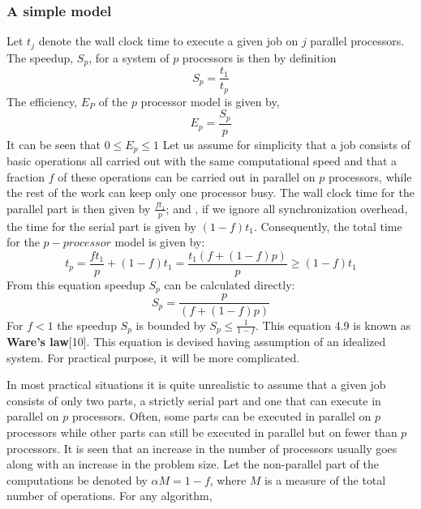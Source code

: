 \subsubsection{A simple model}
Let $t_{j}$ denote the wall clock time to execute a given job on $j$ parallel processors. The speedup, $S_{p}$, for a system of $p$ processors is then by
definition
\begin{equation}
S_{p} = \frac{t_{1}}{t_{p}}
\end{equation}
The efficiency, $E_{P}$ of the $p$ processor model is given by,
\begin{equation}
E_{p} = \frac{S_{p}}{p}
\end{equation}
It can be seen that $0\leq E_{p} \leq 1$ 
Let us assume for simplicity that a job consists of basic operations all carried out with the same computational speed and that a fraction $f$ of these
operations can be carried out in parallel on $p$ processors, while the rest of the work can keep only one processor busy. The wall clock time for the parallel
part is then given by $\frac{ft_{1}}{p}$; and , if we ignore all synchronization overhead, the time for the serial part is given by $(1-f)t_{1}$. Consequently,
the total time for the $p-processor$ model is given by:
\begin{equation}
t_{p} = \frac{ft_{1}}{p} + (1-f)t_{1} = \frac{t_{1}(f+(1-f)p)}{p} \geq (1-f)t_{1}
\end{equation}
From this equation speedup $S_{p}$ can be calculated directly:
\begin{equation}
S_{p} = \frac{p}{(f+(1-f)p)}
\end{equation}
For $f < 1$ the speedup $S_{p}$ is bounded by $S_{p} \leq \frac{1}{1-f}$. This equation 4.9 is known as {\bf Ware's law}[10]. This equation is devised having
assumption of an idealized system. For practical purpose, it will be more complicated.\par
\hspace{1in}In most practical situations it is quite unrealistic to assume that a given job consists of only two parts, a strictly serial part and one that can
execute in parallel on $p$ processors. Often, some parts can be executed in parallel on $p$ processors while other parts can still be executed in parallel but
on fewer than $p$ processors. It is seen that an increase in the number of processors usually goes along with an increase in the problem size. Let the
non-parallel part of the computations be denoted by $\alpha{M} = 1 - f$, where $M$ is a measure of the total number of operations. For any algorithm,

